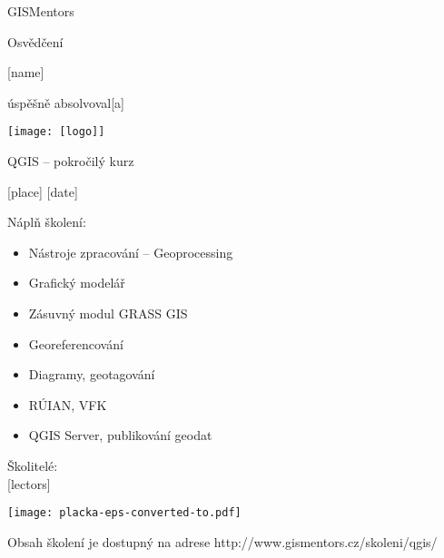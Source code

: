 \documentclass[12pt, a4paper]{letter}
\begin{document}
\pagestyle{empty}
\begin{center}

{\Large GISMentors}

{\Huge Osvědčení}

{\Large [name]}

úspěšně absolvoval[a]

\texttt{[image: [logo]]}

{\Large QGIS -- pokročilý kurz}

[place] [date]
\end{center}

Náplň školení:

\begin{itemize}
    \item Nástroje zpracování -- Geoprocessing
    \item Grafický modelář
    \item Zásuvný modul GRASS GIS
    \item Georeferencování
    \item Diagramy, geotagování
    \item RÚIAN, VFK
    \item QGIS Server, publikování geodat
\end{itemize}

\vfill
\parbox{7cm}{

        Školitelé: \\

        [lectors]


}
\hfill
\parbox{3cm}{
    \texttt{[image: placka-eps-converted-to.pdf]}
}


\begin{center}
{\footnotesize Obsah školení je dostupný na adrese
http://www.gismentors.cz/skoleni/qgis/}
\end{center}
\end{document}
